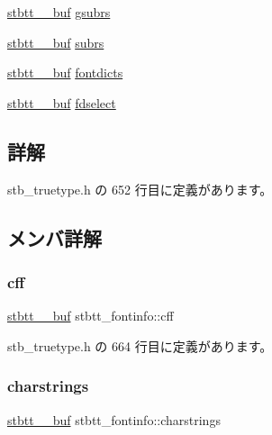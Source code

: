 \begin{DoxyCompactItemize}
\item 
\mbox{\hyperlink{structstbtt____buf}{stbtt\+\_\+\+\_\+buf}} \mbox{\hyperlink{structstbtt__fontinfo_afc5bfc4a52ad0e3879f0f81a372da7fb}{gsubrs}}
\item 
\mbox{\hyperlink{structstbtt____buf}{stbtt\+\_\+\+\_\+buf}} \mbox{\hyperlink{structstbtt__fontinfo_aebc496bb1c001a8a90e0e66da16107d2}{subrs}}
\item 
\mbox{\hyperlink{structstbtt____buf}{stbtt\+\_\+\+\_\+buf}} \mbox{\hyperlink{structstbtt__fontinfo_a966c70ac9548a02fff558846fbce3677}{fontdicts}}
\item 
\mbox{\hyperlink{structstbtt____buf}{stbtt\+\_\+\+\_\+buf}} \mbox{\hyperlink{structstbtt__fontinfo_a4e06b1c29295a9aba529105e88fe1d71}{fdselect}}
\end{DoxyCompactItemize}


\subsection{詳解}


 stb\+\_\+truetype.\+h の 652 行目に定義があります。



\subsection{メンバ詳解}
\mbox{\label{structstbtt__fontinfo_a6031b4bda94aa2b5ff07ef5d626a15a4}} 
\subsubsection{\texorpdfstring{cff}{cff}}
{\footnotesize\ttfamily \mbox{\hyperlink{structstbtt____buf}{stbtt\+\_\+\+\_\+buf}} stbtt\+\_\+fontinfo\+::cff}



 stb\+\_\+truetype.\+h の 664 行目に定義があります。

\mbox{\label{structstbtt__fontinfo_aaf04a69f8dd4b6a8bed4191b57145082}} 
\subsubsection{\texorpdfstring{charstrings}{charstrings}}
{\footnotesize\ttfamily \mbox{\hyperlink{structstbtt____buf}{stbtt\+\_\+\+\_\+buf}} stbtt\+\_\+fontinfo\+::charstrings}



